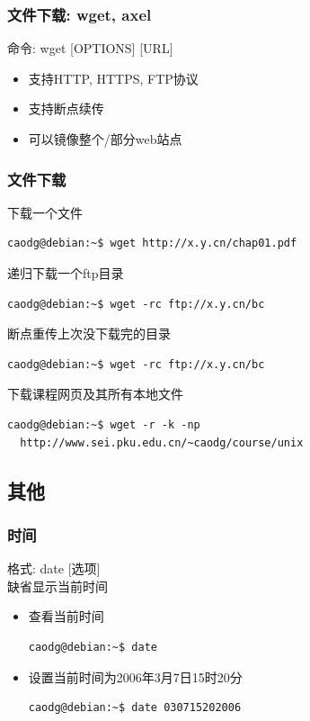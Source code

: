 \documentclass[compress]{beamer}
\begin{document}
\begin{frame}
\frametitle{文件下载: wget, axel}

命令: wget [OPTIONS] [URL]

\begin{itemize}
\item 支持HTTP, HTTPS, FTP协议
\item 支持断点续传
\item 可以镜像整个/部分web站点
\end{itemize}


\end{frame}

\begin{frame}[containsverbatim]
\frametitle{文件下载}

下载一个文件\\
\begin{Verbatim}
caodg@debian:~$ wget http://x.y.cn/chap01.pdf
\end{Verbatim}

递归下载一个ftp目录\\
\begin{Verbatim}
caodg@debian:~$ wget -rc ftp://x.y.cn/bc
\end{Verbatim}

断点重传上次没下载完的目录\\
\begin{Verbatim}
caodg@debian:~$ wget -rc ftp://x.y.cn/bc
\end{Verbatim}

下载课程网页及其所有本地文件\\[1ex]
\begin{Verbatim}
caodg@debian:~$ wget -r -k -np 
  http://www.sei.pku.edu.cn/~caodg/course/unix
\end{Verbatim}

 
\end{frame}

\subsection{其他}

\begin{frame}[containsverbatim]
\frametitle{时间}
格式: \alert{date} [选项]\\
缺省显示当前时间

\begin{itemize}
\item 查看当前时间\\[1ex]
\begin{Verbatim}
caodg@debian:~$ date
\end{Verbatim}

\item 设置当前时间为2006年3月7日15时20分\\[1ex]
\begin{Verbatim}
caodg@debian:~$ date 030715202006
\end{Verbatim}

\end{itemize}


\end{frame}
\end{document}
